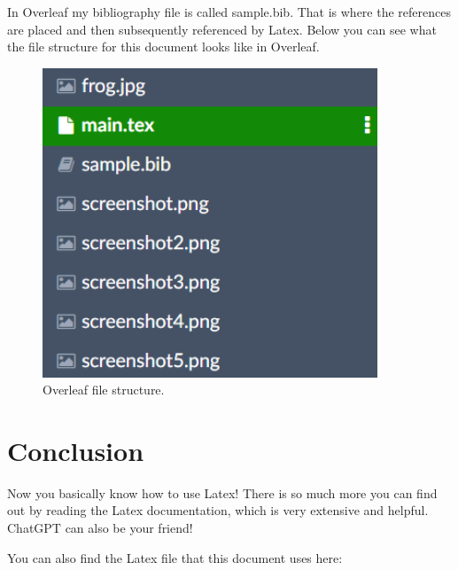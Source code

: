 \documentclass[11pt]{article}
\begin{document}
In Overleaf my bibliography file is called sample.bib. That is where the references are placed and then subsequently referenced by Latex. Below you can see what the file structure for this document looks like in Overleaf.
\begin{figure}[H]
    \centering
    \includegraphics[width=10cm]{screenshot6.png}
    \caption{Overleaf file structure.}
    \label{fig:8}
\end{figure}

\section{Conclusion}
Now you basically know how to use Latex! There is so much more you can find out by reading the Latex documentation, which is very extensive and helpful. ChatGPT can also be your friend!

You can also find the Latex file that this document uses here: 



\end{document}
